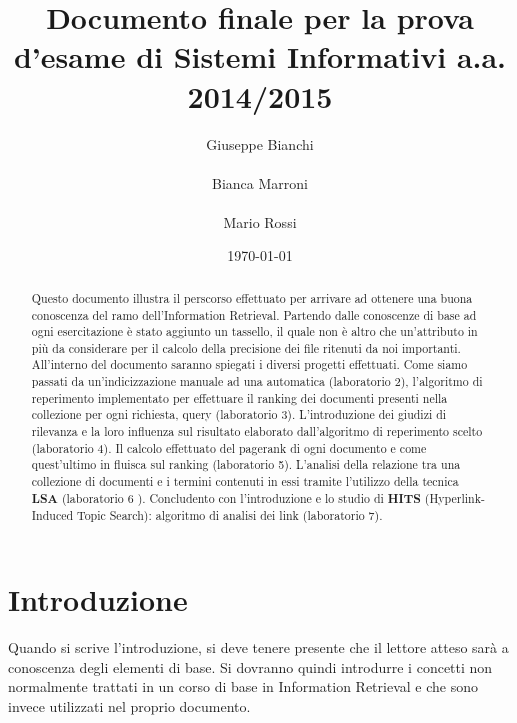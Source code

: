 \documentclass{llncs}
\begin{document}
\title{Documento finale per la prova d'esame di Sistemi Informativi
  a.a. 2014/2015} 
\author{
  Giuseppe Bianchi\\\\ 
  Bianca Marroni\\\\ 
  Mario Rossi\\} 
\institute{}

\date{\today}

\maketitle
\begin{abstract}
	Questo documento illustra il perscorso effettuato per arrivare ad ottenere una buona conoscenza del ramo dell'Information Retrieval.
	Partendo dalle conoscenze di base ad ogni esercitazione è stato aggiunto un tassello, il quale non è altro che un'attributo in più da considerare per il calcolo della precisione dei file ritenuti da noi importanti.
	All'interno del documento saranno spiegati i diversi progetti effettuati. Come siamo passati da un'indicizzazione manuale ad una automatica (laboratorio 2), l'algoritmo di reperimento implementato per effettuare il ranking dei documenti presenti nella collezione per ogni richiesta, query (laboratorio 3). L'introduzione dei giudizi di rilevanza e la loro influenza sul risultato elaborato dall'algoritmo di reperimento scelto (laboratorio 4). Il calcolo effettuato del pagerank di ogni documento e come quest'ultimo in fluisca sul ranking (laboratorio 5). L'analisi della relazione tra una collezione di documenti e i termini contenuti in essi tramite l'utilizzo della tecnica \textbf{LSA} (laboratorio 6 ). Concludento con l'introduzione e lo studio di \textbf{HITS} (Hyperlink-Induced Topic Search): algoritmo di analisi dei link (laboratorio 7).  
	
	
\end{abstract}

\section{Introduzione}
\label{sec:introduzione}

Quando si scrive l'introduzione, si deve tenere presente che il lettore atteso
sar\`a a conoscenza degli elementi di base. Si dovranno quindi introdurre i
concetti non normalmente trattati in un corso di base in Information Retrieval e
che sono invece utilizzati nel proprio documento.
\end{document}
